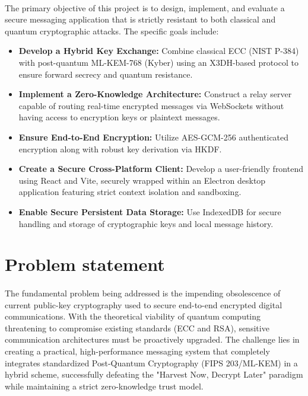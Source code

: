 \paragraph{}
The primary objective of this project is to design, implement, and evaluate a secure messaging application that is strictly resistant to both classical and quantum cryptographic attacks. The specific goals include:
\begin{itemize}
	\item \textbf{Develop a Hybrid Key Exchange:} Combine classical ECC (NIST P-384) with post-quantum ML-KEM-768 (Kyber) using an X3DH-based protocol to ensure forward secrecy and quantum resistance.
	\item \textbf{Implement a Zero-Knowledge Architecture:} Construct a relay server capable of routing real-time encrypted messages via WebSockets without having access to encryption keys or plaintext messages.
	\item \textbf{Ensure End-to-End Encryption:} Utilize AES-GCM-256 authenticated encryption along with robust key derivation via HKDF.
	\item \textbf{Create a Secure Cross-Platform Client:} Develop a user-friendly frontend using React and Vite, securely wrapped within an Electron desktop application featuring strict context isolation and sandboxing.
	\item \textbf{Enable Secure Persistent Data Storage:} Use IndexedDB for secure handling and storage of cryptographic keys and local message history.
\end{itemize}

\section{Problem statement}
\paragraph{}
The fundamental problem being addressed is the impending obsolescence of current public-key cryptography used to secure end-to-end encrypted digital communications. With the theoretical viability of quantum computing threatening to compromise existing standards (ECC and RSA), sensitive communication architectures must be proactively upgraded. The challenge lies in creating a practical, high-performance messaging system that completely integrates standardized Post-Quantum Cryptography (FIPS 203/ML-KEM) in a hybrid scheme, successfully defeating the "Harvest Now, Decrypt Later" paradigm while maintaining a strict zero-knowledge trust model.

